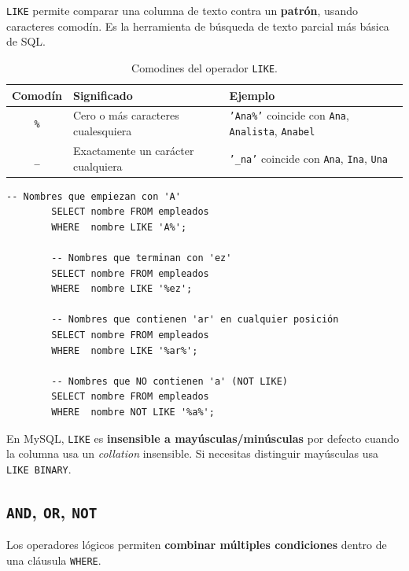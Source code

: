 \documentclass[12pt, a4paper]{article}
\begin{document}
	\texttt{LIKE} permite comparar una columna de texto contra un
	\textbf{patrón}, usando caracteres comodín.
	Es la herramienta de búsqueda de texto parcial más básica de SQL.
	
	\begin{table}[H]
		\centering
		\small
		\renewcommand{\arraystretch}{1.4}
		\begin{tabularx}{\linewidth}{@{} c l X @{}}
			\toprule
			\textbf{Comodín} & \textbf{Significado} & \textbf{Ejemplo} \\
			\midrule
			\texttt{\%} & Cero o más caracteres cualesquiera
			& \texttt{'Ana\%'} coincide con \texttt{Ana}, \texttt{Analista}, \texttt{Anabel} \\
			\texttt{\_} & Exactamente un carácter cualquiera
			& \texttt{'\_na'} coincide con \texttt{Ana}, \texttt{Ina}, \texttt{Una} \\
			\bottomrule
		\end{tabularx}
		\caption{Comodines del operador \texttt{LIKE}.}
		\label{tab:comodines-like}
	\end{table}
	
	\begin{lstlisting}[caption={Patrones con LIKE.}]
		-- Nombres que empiezan con 'A'
		SELECT nombre FROM empleados
		WHERE  nombre LIKE 'A%';
		
		-- Nombres que terminan con 'ez'
		SELECT nombre FROM empleados
		WHERE  nombre LIKE '%ez';
		
		-- Nombres que contienen 'ar' en cualquier posición
		SELECT nombre FROM empleados
		WHERE  nombre LIKE '%ar%';
		
		-- Nombres que NO contienen 'a' (NOT LIKE)
		SELECT nombre FROM empleados
		WHERE  nombre NOT LIKE '%a%';
	\end{lstlisting}
	
	\begin{nota}
		En MySQL, \texttt{LIKE} es \textbf{insensible a mayúsculas/minúsculas}
		por defecto cuando la columna usa un \textit{collation} insensible.
		Si necesitas distinguir mayúsculas usa \texttt{LIKE BINARY}.
	\end{nota}
	
	\subsection{\texttt{AND}, \texttt{OR}, \texttt{NOT}}
	
	Los operadores lógicos permiten \textbf{combinar múltiples
		condiciones} dentro de una cláusula \texttt{WHERE}.
	
\end{document}

